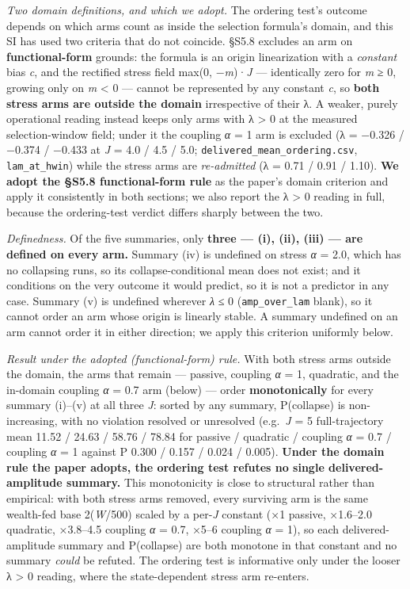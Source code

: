 \documentclass[11pt,letterpaper]{article}
\begin{document}
\emph{Two domain definitions, and which we adopt.} The ordering test's outcome depends on which arms count as inside the selection formula's domain, and this SI has used two criteria that do not coincide. §S5.8 excludes an arm on \textbf{functional-form} grounds: the formula is an origin linearization with a \emph{constant} bias \emph{c}, and the rectified stress field max(0, −\emph{m})·\emph{J} --- identically zero for \emph{m} ≥ 0, growing only on \emph{m} \textless{} 0 --- cannot be represented by any constant \emph{c}, so \textbf{both stress arms are outside the domain} irrespective of their λ. A weaker, purely operational reading instead keeps only arms with λ \textgreater{} 0 at the measured selection-window field; under it the coupling \emph{α} = 1 arm is excluded (λ = −0.326 / −0.374 / −0.433 at \emph{J} = 4.0 / 4.5 / 5.0; \texttt{delivered\_mean\_ordering.csv}, \texttt{lam\_at\_hwin}) while the stress arms are \emph{re-admitted} (λ = 0.71 / 0.91 / 1.10). \textbf{We adopt the §S5.8 functional-form rule} as the paper's domain criterion and apply it consistently in both sections; we also report the λ \textgreater{} 0 reading in full, because the ordering-test verdict differs sharply between the two.

\emph{Definedness.} Of the five summaries, only \textbf{three --- (i), (ii), (iii) --- are defined on every arm.} Summary (iv) is undefined on stress \emph{α} = 2.0, which has no collapsing runs, so its collapse-conditional mean does not exist; and it conditions on the very outcome it would predict, so it is not a predictor in any case. Summary (v) is undefined wherever \emph{λ} ≤ 0 (\texttt{amp\_over\_lam} blank), so it cannot order an arm whose origin is linearly stable. A summary undefined on an arm cannot order it in either direction; we apply this criterion uniformly below.

\emph{Result under the adopted (functional-form) rule.} With both stress arms outside the domain, the arms that remain --- passive, coupling \emph{α} = 1, quadratic, and the in-domain coupling \emph{α} = 0.7 arm (below) --- order \textbf{monotonically} for every summary (i)--(v) at all three \emph{J}: sorted by any summary, P(collapse) is non-increasing, with no violation resolved or unresolved (e.g.~\emph{J} = 5 full-trajectory mean 11.52 / 24.63 / 58.76 / 78.84 for passive / quadratic / coupling \emph{α} = 0.7 / coupling \emph{α} = 1 against P 0.300 / 0.157 / 0.024 / 0.005). \textbf{Under the domain rule the paper adopts, the ordering test refutes no single delivered-amplitude summary.} This monotonicity is close to structural rather than empirical: with both stress arms removed, every surviving arm is the same wealth-fed base 2(\emph{W}/500) scaled by a per-\emph{J} constant (×1 passive, ×1.6--2.0 quadratic, ×3.8--4.5 coupling \emph{α} = 0.7, ×5--6 coupling \emph{α} = 1), so each delivered-amplitude summary and P(collapse) are both monotone in that constant and no summary \emph{could} be refuted. The ordering test is informative only under the looser λ \textgreater{} 0 reading, where the state-dependent stress arm re-enters.
\end{document}
